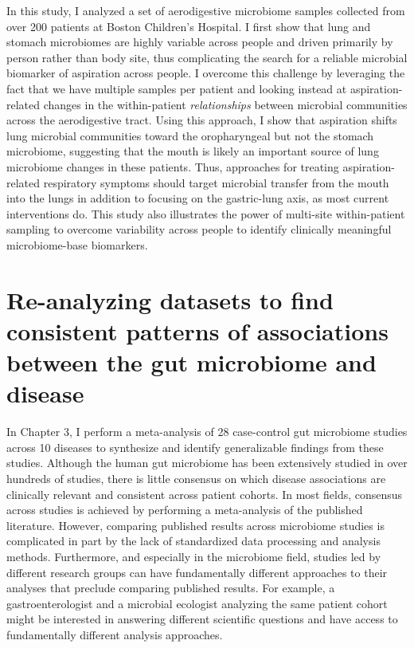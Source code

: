 In this study, I analyzed a set of aerodigestive microbiome samples collected from over 200 patients at Boston Children's Hospital.
I first show that lung and stomach microbiomes are highly variable across people and driven primarily by person rather than body site, thus complicating the search for a reliable microbial biomarker of aspiration across people.
I overcome this challenge by leveraging the fact that we have multiple samples per patient and looking instead at aspiration-related changes in the within-patient \textit{relationships} between microbial communities across the aerodigestive tract.
Using this approach, I show that aspiration shifts lung microbial communities toward the oropharyngeal but not the stomach microbiome, suggesting that the mouth is likely an important source of lung microbiome changes in these patients.
Thus, approaches for treating aspiration-related respiratory symptoms should target microbial transfer from the mouth into the lungs in addition to focusing on the gastric-lung axis, as most current interventions do.
This study also illustrates the power of multi-site within-patient sampling to overcome variability across people to identify clinically meaningful microbiome-base biomarkers.

\section{Re-analyzing datasets to find consistent patterns of associations between the gut microbiome and disease}

In Chapter 3, I perform a meta-analysis of 28 case-control gut microbiome studies across 10 diseases to synthesize and identify generalizable findings from these studies.
Although the human gut microbiome has been extensively studied in over hundreds of studies, there is little consensus on which disease associations are clinically relevant and consistent across patient cohorts.
In most fields, consensus across studies is achieved by performing a meta-analysis of the published literature.
However, comparing published results across microbiome studies is complicated in part by the lack of standardized data processing and analysis methods.
Furthermore, and especially in the microbiome field, studies led by different research groups can have fundamentally different approaches to their analyses that preclude comparing published results.
For example, a gastroenterologist and a microbial ecologist analyzing the same patient cohort might be interested in answering different scientific questions and have access to fundamentally different analysis approaches.

